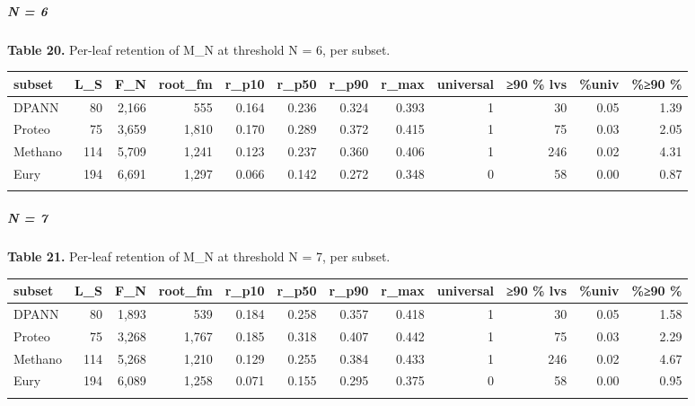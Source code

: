 \documentclass[
  10pt,
]{article}
\begin{document}
\subparagraph{N = 6}\label{n--6}

\textbf{Table 20.} Per-leaf retention of M\_N at threshold N = 6, per
subset.

\begin{center}
\begin{adjustbox}{max width=\textwidth}
\begin{tabular}{@{}lrrrrrrrrrrr@{}}
\toprule\noalign{}
subset & L\_S & F\_N & root\_fm & r\_p10 & r\_p50 & r\_p90 & r\_max &
universal & ≥90 \% lvs & \%univ & \%≥90 \% \\
\midrule\noalign{}
DPANN & 80 & 2,166 & 555 & 0.164 & 0.236 & 0.324 & 0.393 & 1 & 30 & 0.05
& 1.39 \\
Proteo & 75 & 3,659 & 1,810 & 0.170 & 0.289 & 0.372 & 0.415 & 1 & 75 &
0.03 & 2.05 \\
Methano & 114 & 5,709 & 1,241 & 0.123 & 0.237 & 0.360 & 0.406 & 1 & 246
& 0.02 & 4.31 \\
Eury & 194 & 6,691 & 1,297 & 0.066 & 0.142 & 0.272 & 0.348 & 0 & 58 &
0.00 & 0.87 \\
\bottomrule\noalign{}
\end{tabular}
\end{adjustbox}
\end{center}

\subparagraph{N = 7}\label{n--7}

\textbf{Table 21.} Per-leaf retention of M\_N at threshold N = 7, per
subset.

\begin{center}
\begin{adjustbox}{max width=\textwidth}
\begin{tabular}{@{}lrrrrrrrrrrr@{}}
\toprule\noalign{}
subset & L\_S & F\_N & root\_fm & r\_p10 & r\_p50 & r\_p90 & r\_max &
universal & ≥90 \% lvs & \%univ & \%≥90 \% \\
\midrule\noalign{}
DPANN & 80 & 1,893 & 539 & 0.184 & 0.258 & 0.357 & 0.418 & 1 & 30 & 0.05
& 1.58 \\
Proteo & 75 & 3,268 & 1,767 & 0.185 & 0.318 & 0.407 & 0.442 & 1 & 75 &
0.03 & 2.29 \\
Methano & 114 & 5,268 & 1,210 & 0.129 & 0.255 & 0.384 & 0.433 & 1 & 246
& 0.02 & 4.67 \\
Eury & 194 & 6,089 & 1,258 & 0.071 & 0.155 & 0.295 & 0.375 & 0 & 58 &
0.00 & 0.95 \\
\bottomrule\noalign{}
\end{tabular}
\end{adjustbox}
\end{center}
\end{document}
